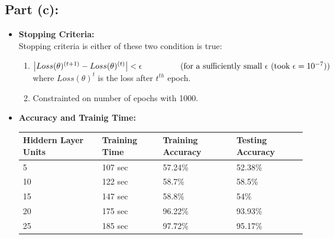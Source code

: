 \documentclass[a4 paper]{article}
\begin{document}
\subsection*{Part (c):}
\begin{itemize}
	\item \textbf{Stopping Criteria:} \\
Stopping criteria is either of these two condition is true:
\begin{enumerate}
\item $\big| Loss(\theta)^{(t+1)} - Loss(\theta)^{(t)} \big| < \epsilon \hspace*{1.65cm} (\text{for a sufficiently small } \epsilon \text{ (took } \epsilon = 10^{-7}))$
\\ where $Loss(\theta)^{t}$ is the loss after $t^{th}$ epoch.
\item Constrainted on number of epochs with 1000.
\end{enumerate}

\item \textbf{Accuracy and Trainig Time:}

\hskip1.0cm\begin{tabular}{ |p{2.7cm}||p{2.5cm}|p{3.3cm}|p{3.3cm}|}
	 \hline
	 \hline \textbf{Hiddern Layer Units} & \textbf{Training Time} & \textbf{Training Accuracy} & \textbf{Testing Accuracy}\\
	 \hline
	 5 &  107 sec &  57.24\% & 52.38\% \\
	 10 & 122 sec & 58.7\% &  58.5\% \\
	 15 & 147 sec & 58.8\% &  54\% \\
	 20 & 175 sec & 96.22\% & 93.93\% \\
	 25 & 185 sec & 97.72\% & 95.17\% \\
	 \hline
\end{tabular}





\end{itemize}
\end{document}
